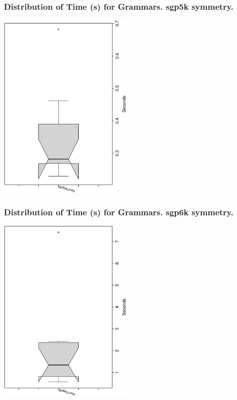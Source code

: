\documentclass[18pt,c]{beamer}
\begin{document}
 \begin{frame}
 \frametitle{ Distribution of Time (s) for Grammars. sgp5k  symmetry. }
 \begin{center}
\includegraphics[width=0.5\textwidth, angle=-90]
{ExpFboxplottSeconds003.eps}
 \end{center}
 \label{ExpFboxplottSeconds003.eps}  
 \end{frame}

 \begin{frame}
 \frametitle{ Distribution of Time (s) for Grammars. sgp6k  symmetry. }
 \begin{center}
\includegraphics[width=0.5\textwidth, angle=-90]
{ExpFboxplottSeconds004.eps}
 \end{center}
 \label{ExpFboxplottSeconds004.eps}  
 \end{frame}
\end{document}
